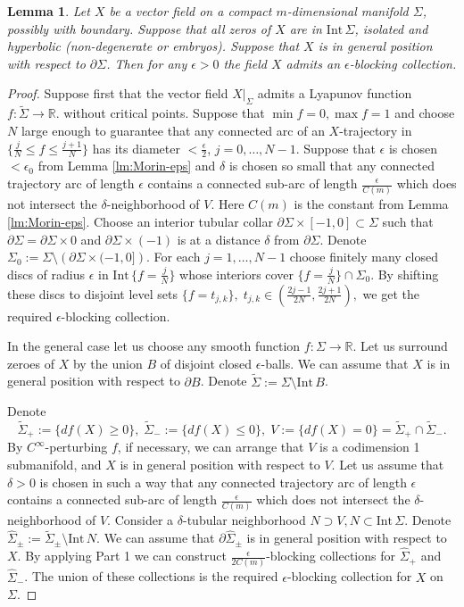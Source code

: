 \documentclass[12pt]{amsart}
\theoremstyle{plain}
\newtheorem{lemma}[theorem]{Lemma}
\theoremstyle{definition}
\theoremstyle{remark}
\newcommand{\R}{\mathbb{R}}
\newcommand{\eps}{\epsilon}
\newcommand{\p}{\partial}
\newcommand{\wt}{\widetilde}
\newcommand{\wh}{\widehat}
\newcommand{\Int}{\mathrm{Int\,}}
\begin{document}
\begin{lemma}\label{lm:exist-discs} Let $X$ be a vector field on a compact $m$-dimensional manifold $\Sigma$, possibly  with boundary. Suppose that all zeros of $X$ are  in $\Int \Sigma$, isolated and hyperbolic (non-degenerate or embryos).    Suppose that $X$ is in  general position with respect to $\p\Sigma$.
Then for any $\eps>0$  the field $X$  admits an $\eps$-blocking collection.
\end{lemma}
\begin{proof}

 Suppose first that the vector field $X|_{\Sigma}$ admits a Lyapunov function $f:\wt\Sigma\to\R$. 
without critical points.  
Suppose that $\min f=0,\max f=1$ and choose $N$  large enough to guarantee that any connected arc of an  $X$-trajectory in $\{\frac jN\leq f\leq \frac{j+1}N\}$ has its diameter $<\frac\eps2$,   $j=0,\dots, N-1$. Suppose that $\eps$ is chosen $<\eps_0$ from Lemma \ref{lm:Morin-eps} and $\delta$ is chosen so small that  any connected trajectory arc   of length $\eps$ contains a connected sub-arc of length $\frac\eps{C(m)}$ which does not intersect   the $\delta$-neighborhood of $V$.  Here $C(m)$  is the constant from Lemma \ref{lm:Morin-eps}.
  Choose an interior tubular collar $\p\Sigma \times[-1,0]\subset\Sigma$ such that $\p\Sigma=\p\Sigma\times 0$ and $\p\Sigma\times (-1)$ is at a distance $\delta$ from $\p\Sigma$. Denote $ \Sigma_0:= \Sigma\setminus\left(\p \Sigma \times(-1,0]\right)$.
For each $j=1,\dots, N-1$ choose   finitely many closed discs of radius $\eps$ in  $\Int \{f=\frac jN\}$ whose interiors cover  $\{f=\frac jN\}\cap \Sigma_0$.   By shifting these discs to disjoint level sets  $\{f=t_{j,k}\},\; t_{j,k}\in(\frac{2j-1}{2N},\frac{2j+1}{2N}),$ we get  the required $\eps$-blocking collection.

\smallskip{}
In the general case  let us choose any smooth function $f:\Sigma\to\R$.
 Let us surround zeroes of $X$ by  the union $B$ of disjoint  closed  $\eps$-balls. We can assume that $X$ is in  general position with respect to $\p B$. Denote $\wt\Sigma:=\Sigma\setminus \Int B$.


 Denote $$\wt\Sigma_+:=\{df(X)\geq 0\},\; \wt\Sigma_-:=\{df(X)\leq 0\},\;   V:=\{df(X)= 0\}=\wt\Sigma_+\cap\wt\Sigma_-.$$
By  $C^\infty$-perturbing   $f$, if necessary, we can arrange that $V$ is a codimension 1 submanifold, and $X$ is   in  general position   with respect to $V$. Let us assume that $\delta>0$ is chosen in such a way that any connected trajectory arc   of length $\eps$ contains a connected sub-arc of length $\frac\eps{C(m)}$ which does not intersect   the $\delta$-neighborhood of $V$.  
 Consider a $\delta$-tubular neighborhood $N\supset V, N\subset\Int\Sigma$. Denote $\wh\Sigma_\pm:=\wt\Sigma_\pm\setminus\Int N$. We can assume that $\p \wh\Sigma_\pm$ is in general position with respect to $X$. By applying Part 1 we can construct  $\frac{\eps}{2C(m)}$-blocking collections for   $\wh\Sigma_+$ and $\wh\Sigma_-$.
The union of these collections is the required $\eps$-blocking collection 
for $X$ on  $\Sigma$.
 

\end{proof}
 
\end{document}
